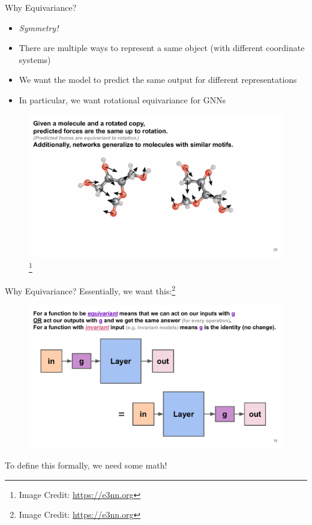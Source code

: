\documentclass[pdf,serif]{beamer}
\newcommand{\empr}[1]{{\color{BerkeleyBlue}\emph{#1}}}
\begin{document}
\begin{frame}{Why Equivariance?}
    \begin{itemize}
        \item \empr{Symmetry!}
        \item There are multiple ways to represent a same object (with different coordinate systems)
        \item We want the model to predict the same output for different representations
        \item In particular, we want rotational equivariance for GNNs
    \end{itemize}
    \begin{figure}
        \includegraphics[width=0.8\linewidth]{images/equatom}\footnote[frame]{Image Credit: \url{https://e3nn.org}}
    \end{figure}
\end{frame}

\begin{frame}{Why Equivariance?}
    Essentially, we want this:\footnote[frame]{Image Credit: \url{https://e3nn.org}}
    \begin{figure}
        \includegraphics[width=\linewidth]{images/equnn}
    \end{figure}
    To define this formally, we need some math!
\end{frame}
\end{document}
